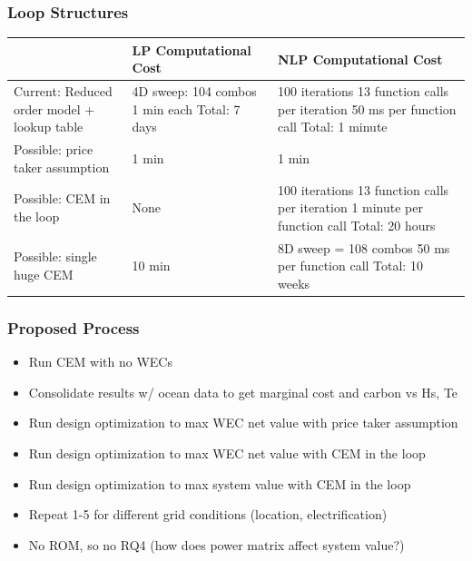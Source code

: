 \begin{frame}
	\frametitle{Loop Structures}
	\begin{tabular}{|l|l|l|} \hline
		                                 & LP Computational Cost & NLP Computational Cost \\ \hline
		Current: Reduced order model + lookup table & 4D sweep: 104 combos
		1 min each
		Total: 7 days & 100 iterations
		13 function calls per iteration
		50 ms per function call
		Total: 1 minute  \\ \hline
		Possible: price taker assumption & 1 min                 & 1 min                  \\ \hline
		Possible: CEM in the loop        & None                  & 100 iterations         
		13 function calls per iteration
		1 minute per function call
		Total: 20 hours  \\ \hline
		Possible: single huge CEM        & 10 min                & 8D sweep = 108 combos  
		50 ms per function call
		Total: 10 weeks  \\ \hline
	\end{tabular}
	
	
\end{frame}


\begin{frame}
	\frametitle{Proposed Process}
	\begin{itemize}
		\item Run CEM with no WECs
		\item Consolidate results w/ ocean data to get marginal cost and carbon vs Hs, Te
		\item Run design optimization to max WEC net value with price taker assumption
		\item Run design optimization to max WEC net value with CEM in the loop
		\item Run design optimization to max system value with CEM in the loop
		\item Repeat 1-5 for different grid conditions (location, electrification)
		\item No ROM, so no RQ4 (how does power matrix affect system value?)
	\end{itemize}
\end{frame}


